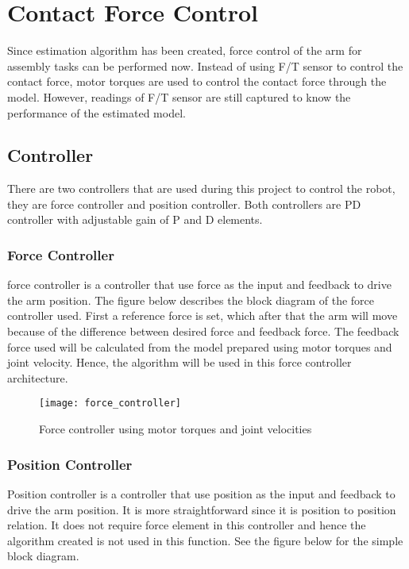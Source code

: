 \chapter{Contact Force Control}

Since estimation algorithm has been created, force control of the arm for assembly tasks can be performed now. Instead of using F/T sensor to control the contact force, motor torques are used to control the contact force through the model. However, readings of F/T sensor are still captured to know the performance of the estimated model.

\section{Controller}
There are two controllers that are used during this project to control the robot, they are force controller and position controller. Both controllers are PD controller with adjustable gain of P and D elements.

\subsection{Force Controller}

force controller is a controller that use force as the input and feedback to drive the arm position. The figure below describes the block diagram of the force controller used. First a reference force is set, which after that the arm will move because of the difference between desired force and feedback force. The feedback force used will be calculated from the model prepared using motor torques and joint velocity. Hence, the algorithm will be used in this force controller architecture.

\begin{figure}[H]
    \centering
    \texttt{[image: force\_controller]}
    \caption{Force controller using motor torques and joint velocities}
    \label{fig: Force controller}
\end{figure}


\subsection{Position Controller}

Position controller is a controller that use position as the input and feedback to drive the arm position. It is more straightforward since it is position to position relation. It does not require force element in this controller and hence the algorithm created is not used in this function. See the figure below for the simple block diagram.

